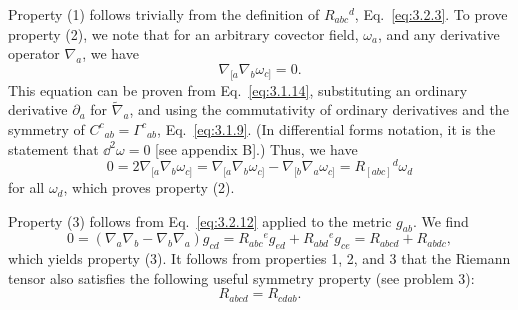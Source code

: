 Property (1) follows trivially from the definition of $R_{abc}{}^d$, Eq.~\eqref{eq:3.2.3}. To
prove property (2), we note that for an arbitrary covector field, $\omega_a$, and any
derivative operator $\nabla_a$, we have
\begin{equation}
  \nabla_{[a}\nabla_b\omega_{c]}=0.
  \tag{3.2.17}\label{eq:3.2.17}
\end{equation}
This equation can be proven from Eq.~\eqref{eq:3.1.14}, substituting an ordinary derivative $\partial_a$ for $\widetilde\nabla_a$, and using the commutativity of ordinary derivatives and the symmetry
of $C^c{}_{ab}=\Gamma^c{}_{ab}$, Eq.~\eqref{eq:3.1.9}. (In differential forms notation, it is the statement
that $\dd^2\omega=0$ [see appendix B].) Thus, we have
\begin{equation}
  0=2\nabla_{[a}\nabla_b\omega_{c]}
  =\nabla_{[a}\nabla_b\omega_{c]}-\nabla_{[b}\nabla_a\omega_{c]}
  =R_{[abc]}{}^d\omega_d
  \tag{3.2.18}\label{eq:3.2.18}
\end{equation}
for all $\omega_d$, which proves property (2).

Property (3) follows from Eq.~\eqref{eq:3.2.12} applied to the metric $g_{ab}$. We find
\begin{equation}
  0=(\nabla_a\nabla_b-\nabla_b\nabla_a)g_{cd}
  =R_{abc}{}^eg_{ed}+R_{abd}{}^eg_{ce}
  =R_{abcd}+R_{abdc},
  \tag{3.2.19}\label{eq:3.2.19}
\end{equation}
which yields property (3). It follows from properties 1, 2, and 3 that the Riemann
tensor also satisfies the following useful symmetry property (see problem 3):
\begin{equation}
  R_{abcd}=R_{cdab}.
  \tag{3.2.20}\label{eq:3.2.20}
\end{equation}

